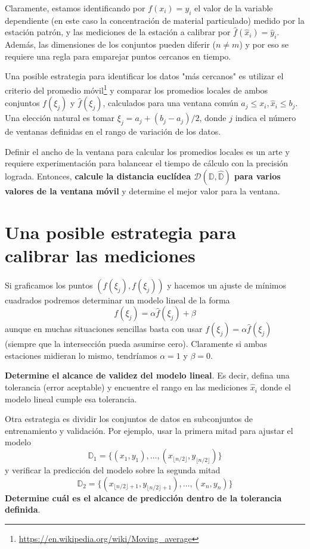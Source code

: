 \documentclass[spanish,notitlepage,letterpaper,12pt]{article} %
\begin{document}
Claramente, estamos identificando por $f(x_{i})=y_{i}$ el valor de la variable dependiente (en este caso la concentración de material particulado) medido por la estación patrón, y las mediciones de la estación a calibrar por $\hat{f}(\hat{x}_{i})=\hat{y}_{i}$. Además, las dimensiones de los conjuntos pueden diferir ($n\neq m$) y por eso se requiere una regla para emparejar puntos cercanos en tiempo.

Una posible estrategia para identificar los datos "más cercanos" es utilizar el criterio del promedio móvil\footnote{\url{https://en.wikipedia.org/wiki/Moving_average}} y comparar los promedios locales de ambos conjuntos $f(\xi_{j})$ y $\hat{f}(\xi_{j})$, calculados para una ventana común $a_{j}\leq x_{i},\hat{x}_{i}\leq b_{j}$. Una elección natural es tomar $\xi_{j}=a_{j}+(b_{j}-a_{j})/2$, donde $j$ indica el número de ventanas definidas en el rango de variación de los datos.

Definir el ancho de la ventana para calcular los promedios locales es un arte y requiere experimentación para balancear el tiempo de cálculo con la precisión lograda. Entonces, \textbf{calcule la distancia euclídea $\mathcal{D}(\mathbb{D},\hat{\mathbb{D}})$ para varios valores de la ventana móvil} y determine el mejor valor para la ventana.

\section{Una posible estrategia para calibrar las mediciones}
Si graficamos los puntos $(\hat{f}(\xi_{j}),f(\xi_{j}))$ y hacemos un ajuste de mínimos cuadrados podremos determinar un modelo lineal de la forma
\begin{equation}
f(\xi_{j}) = \alpha \hat{f}(\xi_{j}) + \beta
\end{equation}
aunque en muchas situaciones sencillas basta con usar $f(\xi_{j})=\alpha \hat{f}(\xi_{j})$ (siempre que la intersección pueda asumirse cero). Claramente si ambas estaciones midieran lo mismo, tendríamos $\alpha=1$ y $\beta=0$.

\textbf{Determine el alcance de validez del modelo lineal}. Es decir, defina una tolerancia (error aceptable) y encuentre el rango en las mediciones $\hat{x}_{i}$ donde el modelo lineal cumple esa tolerancia.

Otra estrategia es dividir los conjuntos de datos en subconjuntos de entrenamiento y validación. Por ejemplo, usar la primera mitad para ajustar el modelo
$$\mathbb{D}_{1}=\{(x_{1},y_{1}),\dots,(x_{\lfloor n/2\rfloor},y_{\lfloor n/2\rfloor})\}$$
y verificar la predicción del modelo sobre la segunda mitad
$$\mathbb{D}_{2}=\{(x_{\lfloor n/2\rfloor+1},y_{\lfloor n/2\rfloor+1}),\dots,(x_{n},y_{n})\}$$
\textbf{Determine cuál es el alcance de predicción dentro de la tolerancia definida}.
\end{document}
